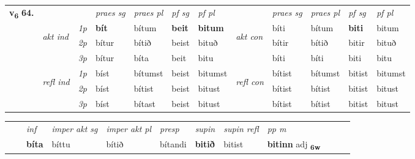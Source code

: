 \begin{tabular}{llllllllllll} \toprule
\multirow{4}{*}{{{\textbf{v{\textsubscript{6}}} \Large{\textbf{64.}}}}}  & &   &  \textit{praes sg}  & \textit{praes pl}  &\textit{ pf sg} & \textit{pf pl} &  &  \textit{praes sg}  & \textit{praes pl}  & \textit{pf sg} & \textit{pf pl } \\*
	\cmidrule{4-7} \cmidrule{9-12}
 & \multirow{3}{*}{\begin{turn}{90}\textit{akt ind}\end{turn}} & {\textit{1p}} & \textbf{bít} & bítum    & \textbf{beit} & \textbf{bitum} & \multirow{3}{*}{\begin{turn}{90}\textit{akt con}\end{turn}} &bíti & bítum & \textbf{biti} & bitum\\*
& &  {\textit{2p}} &  bítur  & bítið   & beist & bituð & & bítir & bítið & bitir & bituð \\*
& &  {\textit{3p}} & bítur & bíta   & beit & bitu & & bíti & bíti& biti & bitu  \\*
\cmidrule{4-7} \cmidrule{9-12}
 &\multirow{3}{*}{\begin{turn}{90}\textit{refl ind}\end{turn}} & {\textit{1p}} & bíst & bítumst    & beist & bitumst & \multirow{3}{*}{\begin{turn}{90}\textit{refl con}\end{turn}}  &bítist & bítumst & bitist & bitumst\\*
 &&  {\textit{2p}} &  bíst  & bítist   & beist & bitust & &bítist & bítist & bitist & bitust \\*
& &  {\textit{3p}} & bíst & bítast   & beist & bitust & & bítist & bítist& bitist & bitust  \\*
\cmidrule{4-7} \cmidrule{9-12}
\end{tabular}


\begin{tabular}{llllllllllll}
 & & \textit{inf} & \textit{imper akt sg} & \textit{imper akt pl}   & \textit{presp} & \textit{supin} & \textit{supin refl} & \textit{pp m}     \\*
  & & \textbf{bíta} & bíttu  & bítið   & bítandi &  \textbf{bitið} & bitist & \textbf{bitinn} adj \textbf{\textsubscript{6w}} \\*
\cmidrule{1-12}
\end{tabular}



